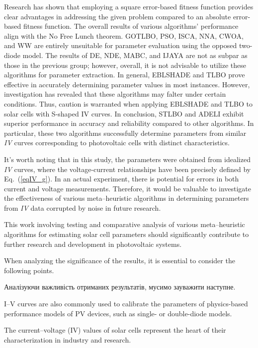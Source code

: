 \documentclass[a4paper,fleqn]{cas-sc}
\begin{document}
Research has shown that employing 
a square error-based fitness function provides 
clear advantages in addressing the given problem compared to 
an absolute error-based fitness function.
The overall results of various algorithms' performance align with the No Free Lunch theorem.
GOTLBO, PSO, ISCA, NNA, CWOA, and WW are entirely unsuitable for parameter evaluation using the opposed two-diode model.
The results of DE, NDE, MABC, and IJAYA are not as subpar as those in the previous group; 
however, overall, it is not advisable to utilize these algorithms for parameter extraction.
In general, EBLSHADE and TLBO prove effective in accurately determining parameter values in most instances.
However, investigation has revealed that these algorithms may falter under certain conditions.
Thus, caution is warranted when applying EBLSHADE and TLBO to solar cells with S-shaped IV curves.
In conclusion, STLBO and ADELI exhibit superior performance in accuracy and reliability compared to other algorithms.
In particular, these two algorithms successfully determine parameters from similar \emph{IV} curves corresponding to photovoltaic cells with distinct characteristics.


It's worth noting that in this study, 
the parameters were obtained from idealized \emph{IV} curves, 
where the voltage-current relationships have been precisely defined by Eq.~(\ref{eqIV_g}).
In an actual experiment, there is potential for errors in both current and voltage measurements. 
Therefore, it would be valuable to investigate the effectiveness of various meta--heuristic algorithms 
in determining parameters from \emph{IV} data corrupted by noise in future research.


This work involving testing and comparative analysis of various meta--heuristic 
algorithms for estimating solar cell parameters should significantly contribute 
to further research and development in photovoltaic systems.


When analyzing the significance of the results, it is essential to consider the following points.




Аналізуючи важливість отриманих результатів, мусимо зауважити наступне.

I–V curves are also commonly used to calibrate the parameters of physics-based performance models of PV devices, such as single- or double-diode models.

The current–voltage (IV) values of solar cells represent the heart
of their characterization in industry and research. 
\end{document}
